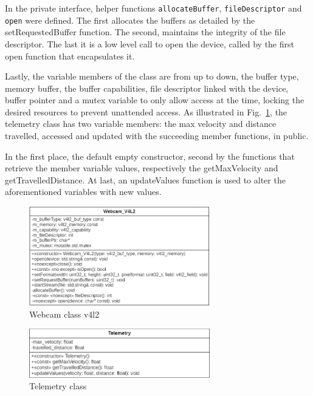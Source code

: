 In the private interface, helper functions \texttt{allocateBuffer}, \texttt{fileDescriptor} and \texttt{open} were defined. The first allocates the buffers as detailed by the setRequestedBuffer function. The second, maintains the integrity of the file descriptor. The last it is a low level call to open the device, called by the first open function that encapsulates it.

Lastly, the variable members of the class are from up to down, the buffer type,
memory buffer, the buffer capabilities, file descriptor linked with the device,
buffer pointer and a mutex variable to only allow access at the time, locking
the desired resources to prevent unattended access.
%
As illustrated in Fig.~\ref{fig:webcam-v4l2-class-diag}, the telemetry class has two variable members: the max velocity and distance travelled, accessed and updated with the succeeding member functions, in public.

In the first place, the default empty constructor, second by the functions that retrieve the member variable values, respectively the getMaxVelocity and getTravelledDistance. At last, an updateValues function is used to alter the aforementioned variables with new values.
%
\begin{figure}[!hbt]
\centering
    \includegraphics[width=0.7\textwidth]{./img/webcam_v4l2_class_diag.png}
  \caption{Webcam class v4l2}%
\label{fig:webcam-v4l2-class-diag}
\end{figure}
%
%
\begin{figure}[!hbt]
\centering
    \includegraphics[width=0.7\textwidth]{./img/telemetry_classdiag.png}
  \caption{Telemetry class}%
\label{fig:telemetry-classdiag}
\end{figure}
%
